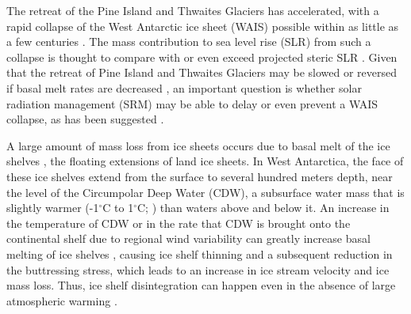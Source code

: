 \documentclass{nature}
\begin{document}
The retreat of the Pine Island and Thwaites Glaciers has accelerated, with a rapid collapse of the West Antarctic ice sheet (WAIS) possible within as little as a few centuries \cite{joughin14,rignot14,favier14}. The mass contribution to sea level rise (SLR) from such a collapse is thought to compare with or even exceed projected steric SLR \cite{church13}. Given that the retreat of Pine Island and Thwaites Glaciers may be slowed or reversed if basal melt rates are decreased \cite{favier14}, an important question is whether solar radiation management (SRM) may be able to delay or even prevent a WAIS collapse, as has been suggested \cite{blackstock09}.

A large amount of mass loss from ice sheets occurs due to basal melt of the ice shelves \cite{joughin11}, the floating extensions of land ice sheets. In West Antarctica, the face of these ice shelves extend from the surface to several hundred meters depth, near the level of the Circumpolar Deep Water (CDW), a subsurface water mass that is slightly warmer (-1$^\circ$C to 1$^\circ$C; \cite{yin11}) than waters above and below it. An increase in the temperature of CDW or in the rate that CDW is brought onto the continental shelf due to regional wind variability can greatly increase basal melting of ice shelves \cite{thoma08,joughin11}, causing ice shelf thinning and a subsequent reduction in the buttressing stress, which leads to an increase in ice stream velocity and ice mass loss\cite{oppenheimer98,pritchard12}. Thus, ice shelf disintegration can happen even in the absence of large atmospheric warming \cite{oppenheimer98}. %
\end{document}
